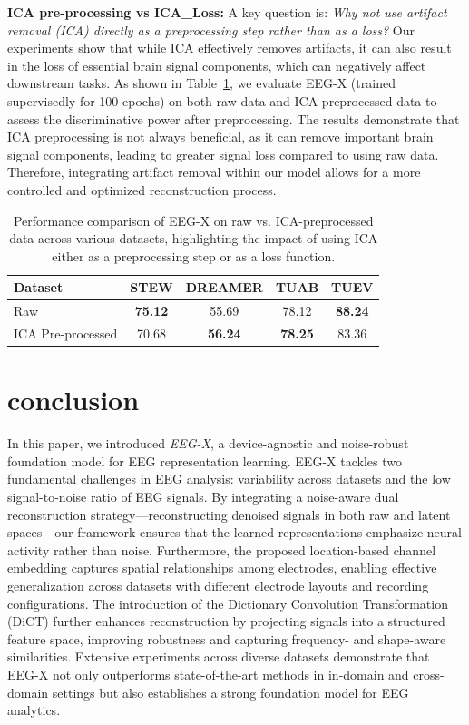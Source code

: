 \documentclass{article} %
\begin{document}
\textbf{ICA pre-processing vs ICA\_Loss:}
A key question is: \textit{Why not use artifact removal (ICA) directly as a preprocessing step rather than as a loss?} Our experiments show that while ICA effectively removes artifacts, it can also result in the loss of essential brain signal components, which can negatively affect downstream tasks. As shown in Table~\ref{tab:ICA_preprocess}, we evaluate EEG-X (trained supervisedly for 100 epochs) on both raw data and ICA-preprocessed data to assess the discriminative power after preprocessing. The results demonstrate that ICA preprocessing is not always beneficial, as it can remove important brain signal components, leading to greater signal loss compared to using raw data. Therefore, integrating artifact removal within our model allows for a more controlled and optimized reconstruction process.
\begin{table}[ht]
\centering
\setlength\extrarowheight{3pt}
\setlength{\tabcolsep}{4pt} %
\caption{Performance comparison of EEG-X on raw vs. ICA-preprocessed data across various datasets, highlighting the impact of using ICA either as a preprocessing step or as a loss function.}
{\footnotesize  %
    \begin{tabular}{l|cccc}
    \hline
     \textbf{Dataset} & \textbf{STEW} & \textbf{DREAMER} & \textbf{TUAB} & \textbf{TUEV} \\ \hline
    Raw  & \textbf{75.12} & 55.69 & 78.12 & \textbf{88.24} \\ \hline
    ICA Pre-processed & 70.68 & \textbf{56.24} & \textbf{78.25} & 83.36 \\ \hline
    \end{tabular}
}
\vspace{-0.5cm}
\label{tab:ICA_preprocess}
\end{table}
\vspace{-0.5cm}
\section{conclusion}
In this paper, we introduced \textit{EEG-X}, a device-agnostic and noise-robust foundation model for EEG representation learning. EEG-X tackles two fundamental challenges in EEG analysis: variability across datasets and the low signal-to-noise ratio of EEG signals. By integrating a noise-aware dual reconstruction strategy—reconstructing denoised signals in both raw and latent spaces—our framework ensures that the learned representations emphasize neural activity rather than noise. Furthermore, the proposed location-based channel embedding captures spatial relationships among electrodes, enabling effective generalization across datasets with different electrode layouts and recording configurations. The introduction of the Dictionary Convolution Transformation (DiCT) further enhances reconstruction by projecting signals into a structured feature space, improving robustness and capturing frequency- and shape-aware similarities. Extensive experiments across diverse datasets demonstrate that EEG-X not only outperforms state-of-the-art methods in in-domain and cross-domain settings but also establishes a strong foundation model for EEG analytics. 
\end{document}
